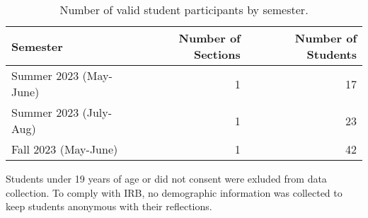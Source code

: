 \documentclass[
  12pt,
]{article}
\providecommand{\DIFaddend}{} %
\DeclareRobustCommand{\DIFaddend}{\DIFOaddend \let\includegraphics\DIFOincludegraphics} %
\begin{document}
\newpage
\DIFaddend 

\begin{table}[H]

\begin{threeparttable}
\caption{\label{tab:unnamed-chunk-5}Number of valid student participants by semester.}
\centering
\begin{tabular}[t]{lrr}
\toprule
Semester & Number of Sections & Number of Students\\
\midrule
Summer 2023 (May-June) & 1 & 17\\
Summer 2023 (July-Aug) & 1 & 23\\
Fall 2023 (May-June) & 1 & 42\\
\bottomrule
\end{tabular}
\begin{tablenotes}
\small
\item [] Students under 19 years of age or did not consent were exluded from data collection. To comply with IRB, no demographic information was collected to keep students anonymous with their reflections.
\end{tablenotes}
\end{threeparttable}
\end{table}
\end{document}
